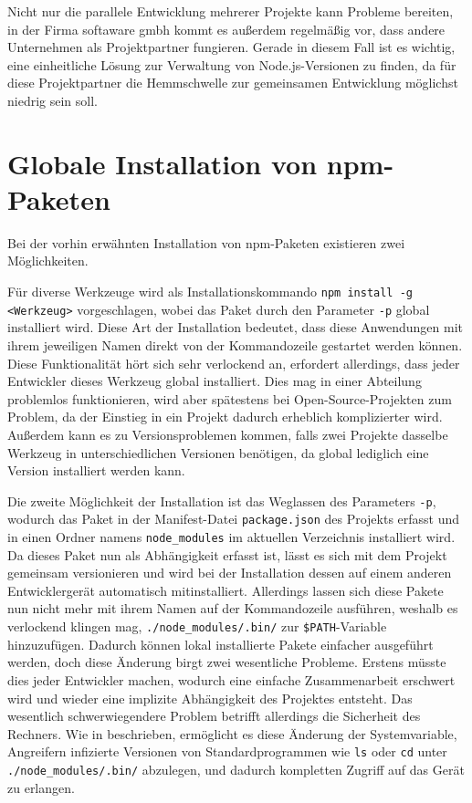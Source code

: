 Nicht nur die parallele Entwicklung mehrerer Projekte kann Probleme bereiten, in der Firma softaware gmbh kommt es außerdem regelmäßig vor, dass andere Unternehmen als Projektpartner fungieren.
Gerade in diesem Fall ist es wichtig, eine einheitliche Lösung zur Verwaltung von Node.js-Versionen zu finden, da für diese Projektpartner die Hemmschwelle zur gemeinsamen Entwicklung möglichst niedrig sein soll.


\section{Globale Installation von npm-Paketen}
Bei der vorhin erwähnten Installation von npm-Paketen existieren zwei Möglichkeiten.

Für diverse Werkzeuge wird als Installationskommando \verb|npm install -g <Werkzeug>| vorgeschlagen, wobei das Paket durch den Parameter \verb|-p| global installiert wird.
Diese Art der Installation bedeutet, dass diese Anwendungen mit ihrem jeweiligen Namen direkt von der Kommandozeile gestartet werden können.
Diese Funktionalität hört sich sehr verlockend an, erfordert allerdings, dass jeder Entwickler dieses Werkzeug global installiert.
Dies mag in einer Abteilung problemlos funktionieren, wird aber spätestens bei Open-Source-Projekten zum Problem, da der Einstieg in ein Projekt dadurch erheblich komplizierter wird.
Außerdem kann es zu Versionsproblemen kommen, falls zwei Projekte dasselbe Werkzeug in unterschiedlichen Versionen benötigen, da global lediglich eine Version installiert werden kann.

Die zweite Möglichkeit der Installation ist das Weglassen des Parameters \verb|-p|, wodurch das Paket in der Manifest-Datei \verb|package.json| des Projekts erfasst und in einen Ordner namens \verb|node_modules| im aktuellen Verzeichnis installiert wird.
Da dieses Paket nun als Abhängigkeit erfasst ist, lässt es sich mit dem Projekt gemeinsam versionieren und wird bei der Installation dessen auf einem anderen Entwicklergerät automatisch mitinstalliert.
Allerdings lassen sich diese Pakete nun nicht mehr mit ihrem Namen auf der Kommandozeile ausführen, weshalb es verlockend klingen mag, \verb|./node_modules/.bin/| zur \verb|$PATH|-Variable hinzuzufügen.
Dadurch können lokal installierte Pakete einfacher ausgeführt werden, doch diese Änderung birgt zwei wesentliche Probleme.
Erstens müsste dies jeder Entwickler machen, wodurch eine einfache Zusammenarbeit erschwert wird und wieder eine implizite Abhängigkeit des Projektes entsteht.
Das wesentlich schwerwiegendere Problem betrifft allerdings die Sicherheit des Rechners.
Wie in \autocite{stackoverflow:nodemodules-hack:online} beschrieben, ermöglicht es diese Änderung der Systemvariable, Angreifern infizierte Versionen von Standardprogrammen wie \verb|ls| oder \verb|cd| unter \verb|./node_modules/.bin/| abzulegen, und dadurch kompletten Zugriff auf das Gerät zu erlangen.

